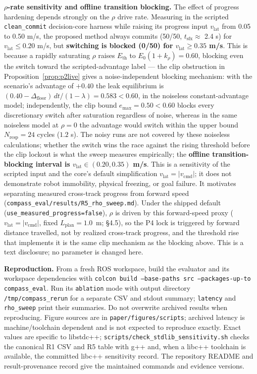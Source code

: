 \documentclass[11pt]{article}
\newcommand{\Dfloor}{\Delta_{\text{floor}}}
\newcommand{\Eth}{E_{\text{th}}}
\newcommand{\code}[1]{\texttt{#1}}
\begin{document}
\textbf{$\rho$-rate sensitivity and offline transition blocking.} The effect of progress hardening depends strongly on the $\rho$ drive rate. Measuring in the scripted \code{clean\_commit} decision-core harness while raising its progress input $v_{\text{lat}}$ from 0.05 to 0.50 m/s, the proposed method always commits (50/50, $t_{\text{sfx}} \approx$ 2.4 s) for $v_{\text{lat}} \le 0.20$ m/s, but \textbf{switching is blocked (0/50) for $v_{\text{lat}} \ge 0.35$ m/s}. This is because a rapidly saturating $\rho$ raises $\Eth$ to $E_0(1+k_\rho) = 0.60$, blocking even the switch toward the scripted-advantage label --- the clip obstruction in Proposition~\ref{prop:p2live} gives a noise-independent blocking mechanism: with the scenario's advantage of $+0.40$ the leak equilibrium is $(0.40-\Dfloor)\,dt/(1-\lambda) = 0.583 < 0.60$, in the noiseless constant-advantage model; independently, the clip bound $e_{\max}=0.50<0.60$ blocks every discretionary switch after saturation regardless of noise, whereas in the same noiseless model at $\rho = 0$ the advantage would switch within the upper bound $N_{\text{resp}} = 24$ cycles ($1.2$ s). The noisy runs are not covered by these noiseless calculations; whether the switch wins the race against the rising threshold before the clip lockout is what the sweep measures empirically; the \textbf{offline transition-blocking interval is $v_{\text{lat}} \in (0.20, 0.35)$ m/s}. This is a sensitivity of the scripted input and the core's default simplification $v_{\text{lat}}=|v_{\text{cmd}}|$; it does not demonstrate robot immobility, physical freezing, or goal failure. It motivates separating measured cross-track progress from forward speed (\code{compass\_eval/results/R5\_rho\_sweep.md}). Under the shipped default (\code{use\_measured\_progress=false}), $\rho$ is driven by this forward-speed proxy ($v_{\text{lat}}=|v_{\text{cmd}}|$, fixed $L_{\text{plan}}=1.0$~m; \S4.5), so the P4 lock is triggered by forward distance travelled, not by realized cross-track progress, and the threshold rise that implements it is the same clip mechanism as the blocking above. This is a text disclosure; no parameter is changed here.

\textbf{Reproduction.} From a fresh ROS workspace, build the evaluator and its workspace dependencies with \code{colcon build --base-paths src --packages-up-to compass\_eval}. Run its \code{ablation} mode with output directory \code{/tmp/compass\_rerun} for a separate CSV and stdout summary; \code{latency} and \code{rho\_sweep} print their summaries. Do not overwrite archived results when reproducing. Figure sources are in \code{paper/figures/scripts}; archived latency is machine/toolchain dependent and is not expected to reproduce exactly. Exact values are specific to libstdc++; \code{scripts/check\_stdlib\_sensitivity.sh} checks the canonical R1 CSV and R5 table with g++ and, when a libc++ toolchain is available, the committed libc++ sensitivity record. The repository README and result-provenance record give the maintained commands and evidence versions.
\end{document}
